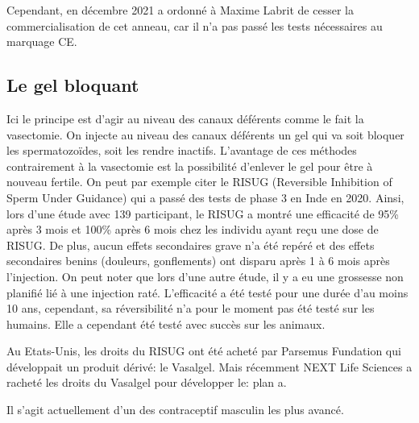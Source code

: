 \documentclass[12pt,a4paper]{report}
\begin{document}
Cependant, en décembre 2021 a ordonné à Maxime Labrit de cesser la commercialisation de cet anneau, car il n'a pas passé les tests nécessaires au marquage CE. \cite{ActualiteAnneauContraceptif}

\subsection{Le gel bloquant}

Ici le principe est d'agir au niveau des canaux déférents comme le fait la vasectomie. On injecte au niveau des canaux déférents un gel qui va soit bloquer les spermatozoïdes, soit les rendre inactifs.
L'avantage de ces méthodes contrairement à la vasectomie est la possibilité d'enlever le gel pour être à nouveau fertile.
On peut par exemple citer le RISUG (Reversible Inhibition of Sperm Under Guidance) qui a passé des tests de phase 3 en Inde en 2020. \cite{ContraceptionMasculineScience}
Ainsi, lors d'une étude avec 139 participant, le RISUG a montré une efficacité de 95\% après 3 mois et 100\% après 6 mois chez les individu ayant reçu une dose de RISUG. De plus, aucun effets secondaires grave n'a été repéré et des effets secondaires benins (douleurs, gonflements) ont disparu après 1 à 6 mois après l'injection. \cite{sharmaSafetyEfficacyIntravasal2019}
On peut noter que lors d'une autre étude, il y a eu une grossesse non planifié lié à une injection raté. \cite{RisugWikipedia}
L'efficacité a été testé pour une durée d'au moins 10 ans, cependant, sa réversibilité n'a pour le moment pas été testé sur les humains. Elle a cependant été testé avec succès sur les animaux. \cite{khilwaniRISUGMaleContraceptive2020}

Au Etats-Unis, les droits du RISUG ont été acheté par Parsemus Fundation qui développait un produit dérivé: le Vasalgel. Mais récemment NEXT Life Sciences a racheté les droits du Vasalgel pour développer le: plan a. \cites{ReversibleInhibitionSperm}{VasalgelMaleContraceptive}{PlanReversibleMale}

Il s'agit actuellement d'un des contraceptif masculin les plus avancé. \cite{ContraceptionMasculineScience}

\listoffigures
\end{document}

